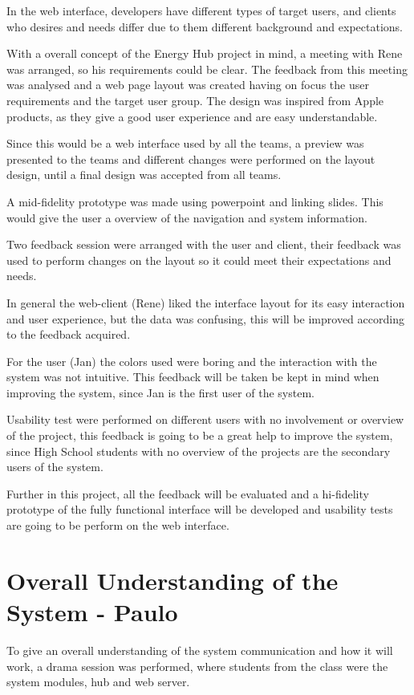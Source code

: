 In the web interface, developers have different types of target users, and clients who desires and needs differ due to them different background and expectations. 

With a overall concept of the Energy Hub project in mind, a meeting with Rene was arranged, so his requirements could be clear. The feedback from this meeting was analysed and a web page layout was created having on focus the user requirements and the target user group. The design was inspired from Apple products, as they give a good user experience and are easy understandable.

Since this would be a web interface used by all the teams, a preview was presented to the teams and different changes were performed on the layout design, until a final design was accepted from all teams. 

A mid-fidelity prototype was made using powerpoint and linking slides. This would give the user a overview of the navigation and system information.

Two feedback session were arranged with the user and client, their feedback was used to perform changes on the layout so it could meet their expectations and needs.

In general the web-client (Rene) liked the interface layout for its easy interaction and user experience, but the data was confusing, this will be improved according to the feedback acquired.

For the user (Jan) the colors used were boring and the interaction with the system was not intuitive. This feedback will be taken be kept in mind when improving the system, since Jan is the first user of the system.

Usability test were performed on different users with no involvement or overview of the project, this feedback is going to be a great help to improve the system, since High School students with no overview of the projects are the secondary users of the system.

Further in this project, all the feedback will be evaluated and a hi-fidelity prototype of the fully functional interface will be developed and usability tests are going to be perform on the web interface.

\section{Overall Understanding of the System - Paulo} 

To give an overall understanding of the system communication and how it will work, a drama session was performed, where students from the class were the system modules, hub and web server.

